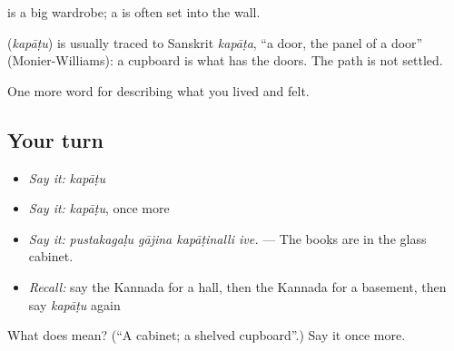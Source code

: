  is a big wardrobe; a  is often set into the wall.

\begin{cousinweb}
\textbf{} (\emph{kapāṭu}) is usually traced to Sanskrit \emph{kapāṭa}, \textquotedblleft{}a door, the panel of a door\textquotedblright{} (Monier-Williams): a cupboard is what has the doors. The path is not settled.
\end{cousinweb}

\begin{grammarlens}[title={What you've built}]
One more word for describing what you lived and felt.
\end{grammarlens}

\subsection*{Your turn}
\begin{itemize}
\raggedright
  \item \emph{Say it:} \emph{kapāṭu}
  \item \emph{Say it:} \emph{kapāṭu}, once more
  \item \emph{Say it:} \emph{pustakagaḷu gājina kapāṭinalli ive.} — The books are in the glass cabinet.
  \item \emph{Recall:} say the Kannada for a hall, then the Kannada for a basement, then say \emph{kapāṭu} again
\end{itemize}

\begin{tcolorbox}[breakable,colback=teal!4,colframe=teal!35!black,title={Before you move on}]
What does  mean? (\textquotedblleft{}A cabinet; a shelved cupboard\textquotedblright{}.) Say it once more.
\end{tcolorbox}
